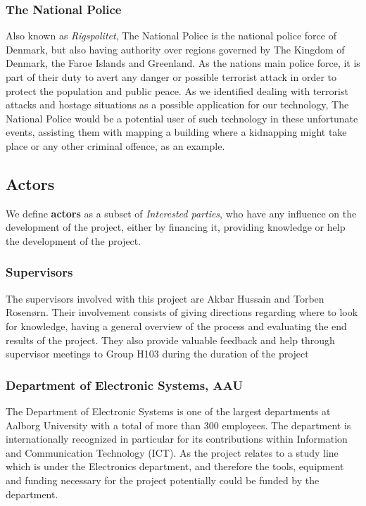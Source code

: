 \subsubsection{The National Police}
Also known as \textit{Rigspolitet}\cite{Police}, The National Police is the national police force of Denmark, but also having authority over regions governed by The Kingdom of Denmark, the Faroe Islands and Greenland. As the nations main police force, it is part of their duty to avert any danger or possible terrorist attack in order to protect the population and public peace. As we identified dealing with terrorist attacks and hostage situations as a possible application for our technology, The National Police would be a potential user of such technology in these unfortunate events, assisting them with mapping a building where a kidnapping might take place or any other criminal offence, as an example.

\subsection{Actors}
We define \textbf{actors} as a subset of \textit{Interested parties}, who have any influence on the development of the project, either by financing it, providing knowledge or help the development of the project.

\subsubsection{Supervisors} 
The supervisors involved with this project are Akbar Hussain and Torben Rosenørn. Their involvement consists of giving directions regarding where to look for knowledge, having a general overview of the process and evaluating the end results of the project. They also provide valuable feedback and help through supervisor meetings to Group H103 during the duration of the project

\subsubsection{Department of Electronic Systems, AAU} 
The Department of Electronic Systems is one of the largest departments at Aalborg University with a total of more than 300 employees. The department is internationally recognized in particular for its contributions within Information and Communication Technology (ICT). As the project relates to a study line which is under the Electronics department, and therefore the tools, equipment and funding necessary for the project potentially could be funded by the department.
	
